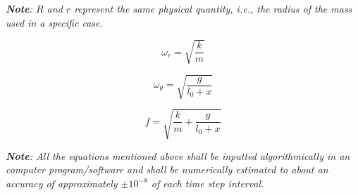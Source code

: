         \textit{\textbf{Note}: $R$ and $r$ represent the same physical quantity, i.e., the radius of the mass used in a specific case.}
            
    \begin{equation}
        \omega_r = \sqrt{\frac{k}{m}}
        \label{eq5}
    \end{equation}
            
    \begin{equation}
        \omega_\theta = \sqrt{\frac{g}{l_0 + x}}
        \label{eq6}
    \end{equation}
            
    \begin{equation}
        f = \sqrt{\frac{k}{m} + \frac{g}{l_0 + x}}
        \label{eq7}
    \end{equation}
            
\textit{\textbf{Note}: All the equations mentioned above shall be inputted algorithmically in an computer program/software and shall be numerically estimated to about an accuracy of approximately $\pm10^{-8}$ of each time step interval.}
            
            




